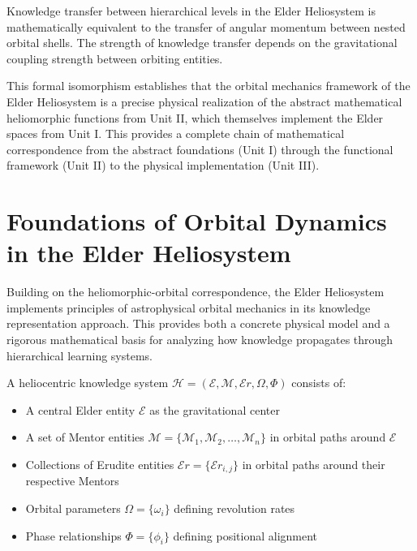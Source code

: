 \begin{corollary}
\label{cor:knowledge_transfer}
Knowledge transfer between hierarchical levels in the Elder Heliosystem is mathematically equivalent to the transfer of angular momentum between nested orbital shells. The strength of knowledge transfer depends on the gravitational coupling strength between orbiting entities.
\end{corollary}

This formal isomorphism establishes that the orbital mechanics framework of the Elder Heliosystem is a precise physical realization of the abstract mathematical heliomorphic functions from Unit II, which themselves implement the Elder spaces from Unit I. This provides a complete chain of mathematical correspondence from the abstract foundations (Unit I) through the functional framework (Unit II) to the physical implementation (Unit III).

\section{Foundations of Orbital Dynamics in the Elder Heliosystem}

Building on the heliomorphic-orbital correspondence, the Elder Heliosystem implements principles of astrophysical orbital mechanics in its knowledge representation approach. This provides both a concrete physical model and a rigorous mathematical basis for analyzing how knowledge propagates through hierarchical learning systems.

\begin{definition}
A heliocentric knowledge system $\mathcal{H} = (\mathcal{E}, \mathcal{M}, \mathcal{E}r, \Omega, \Phi)$ consists of:
\begin{itemize}
    \item A central Elder entity $\mathcal{E}$ as the gravitational center
    \item A set of Mentor entities $\mathcal{M} = \{\mathcal{M}_1, \mathcal{M}_2, \ldots, \mathcal{M}_n\}$ in orbital paths around $\mathcal{E}$
    \item Collections of Erudite entities $\mathcal{E}r = \{\mathcal{E}r_{i,j}\}$ in orbital paths around their respective Mentors
    \item Orbital parameters $\Omega = \{\omega_i\}$ defining revolution rates
    \item Phase relationships $\Phi = \{\phi_i\}$ defining positional alignment
\end{itemize}
\end{definition}

